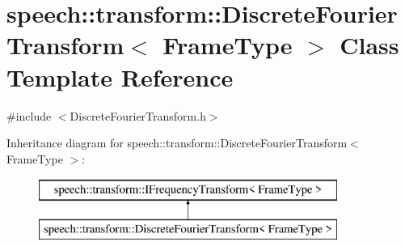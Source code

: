 \hypertarget{classspeech_1_1transform_1_1DiscreteFourierTransform}{\section{speech\+:\+:transform\+:\+:Discrete\+Fourier\+Transform$<$ Frame\+Type $>$ Class Template Reference}
\label{classspeech_1_1transform_1_1DiscreteFourierTransform}
}


{\ttfamily \#include $<$Discrete\+Fourier\+Transform.\+h$>$}

Inheritance diagram for speech\+:\+:transform\+:\+:Discrete\+Fourier\+Transform$<$ Frame\+Type $>$\+:\begin{figure}[H]
\begin{center}
\leavevmode
\includegraphics[height=2.000000cm]{classspeech_1_1transform_1_1DiscreteFourierTransform}
\end{center}
\end{figure}
